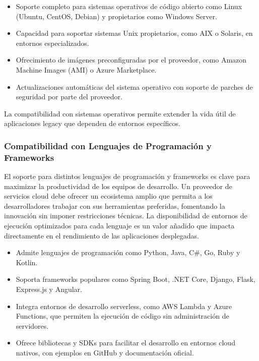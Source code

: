 {                \begin{itemize}
                    \item Soporte completo para sistemas operativos de código abierto como Linux (Ubuntu, CentOS, Debian) y propietarios como Windows Server.
                    \item Capacidad para soportar sistemas Unix propietarios, como AIX o Solaris, en entornos especializados.
                    \item Ofrecimiento de imágenes preconfiguradas por el proveedor, como Amazon Machine Images (AMI) o Azure Marketplace.
                    \item Actualizaciones automáticas del sistema operativo con soporte de parches de seguridad por parte del proveedor.
                \end{itemize}
                
                La compatibilidad con sistemas operativos permite extender la vida útil de aplicaciones legacy que dependen de entornos específicos.
                
            \subsubsection{Compatibilidad con Lenguajes de Programación y Frameworks}
                El soporte para distintos lenguajes de programación y frameworks es clave para maximizar la productividad de los equipos de desarrollo. Un proveedor de servicios cloud debe ofrecer un ecosistema amplio que permita a los desarrolladores trabajar con sus herramientas preferidas, fomentando la innovación sin imponer restricciones técnicas. La disponibilidad de entornos de ejecución optimizados para cada lenguaje es un valor añadido que impacta directamente en el rendimiento de las aplicaciones desplegadas.
                
                \begin{itemize}
                    \item Admite lenguajes de programación como Python, Java, C\#, Go, Ruby y Kotlin.
                    \item Soporta frameworks populares como Spring Boot, .NET Core, Django, Flask, Express.js y Angular.
                    \item Integra entornos de desarrollo serverless, como AWS Lambda y Azure Functions, que permiten la ejecución de código sin administración de servidores.
                    \item Ofrece bibliotecas y SDKs para facilitar el desarrollo en entornos cloud nativos, con ejemplos en GitHub y documentación oficial.
                \end{itemize}
                
}

